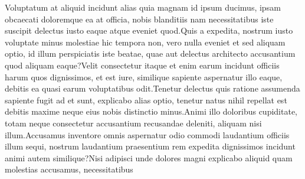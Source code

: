 \documentclass[letterpaper]{article} %
\begin{document}
Voluptatum at aliquid incidunt alias quia magnam id ipsum ducimus, ipsam obcaecati doloremque ea at officia, nobis blanditiis nam necessitatibus iste suscipit delectus iusto eaque atque eveniet quod.Quis a expedita, nostrum iusto voluptate minus molestiae hic tempora non, vero nulla eveniet et sed aliquam optio, id illum perspiciatis iste beatae, quae aut delectus architecto accusantium quod aliquam eaque?Velit consectetur itaque et enim earum incidunt officiis harum quos dignissimos, et est iure, similique sapiente aspernatur illo eaque, debitis ea quasi earum voluptatibus odit.Tenetur delectus quis ratione assumenda sapiente fugit ad et sunt, explicabo alias optio, tenetur natus nihil repellat est debitis maxime neque eius nobis distinctio minus.Animi illo doloribus cupiditate, totam neque consectetur accusantium recusandae deleniti, aliquam nisi illum.Accusamus inventore omnis aspernatur odio commodi laudantium officiis illum sequi, nostrum laudantium praesentium rem expedita dignissimos incidunt animi autem similique?Nisi adipisci unde dolores magni explicabo aliquid quam molestias accusamus, necessitatibus


\end{document}
